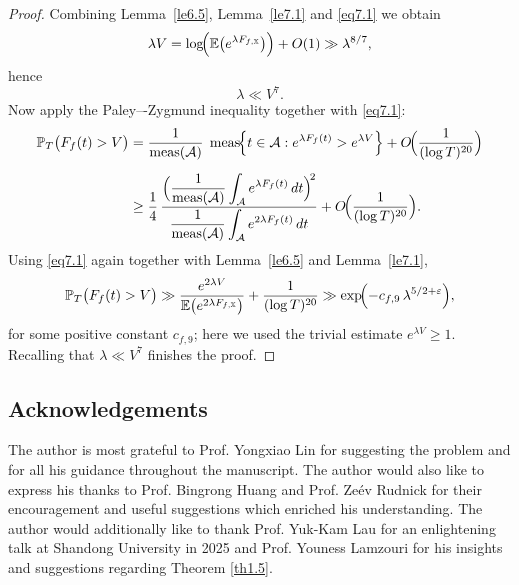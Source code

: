\documentclass[10pt,leqno]{amsart}
\numberwithin{equation}{section}
\begin{document}
\begin{proof}
    Combining Lemma~\ref{le6.5}, Lemma~\ref{le7.1} and \eqref{eq7.1} we obtain
    \[
    \lambda V = \log\!\Bigl(\mathbb{E}\bigl(e^{\lambda F_{f,\mathbb{X}}}\bigr)\Bigr)+O(1)
    \gg \lambda^{8/7},
    \]
    hence
    \[
    \lambda \ll  V^{7}.
    \]
    Now apply the Paley–-Zygmund inequality together with \eqref{eq7.1}:
    \[
    \begin{aligned}
    \mathbb{P}_T\bigl(F_f(t) > V\bigr)
    &=\frac{1}{\operatorname{meas}(\mathcal{A})}\;
    \operatorname{meas}\!\Bigl\{t\in\mathcal{A}:e^{\lambda F_f(t)}>e^{\lambda V}\Bigr\}
    +O\!\Bigl(\frac{1}{(\log T)^{20}}\Bigr) \\[2mm]
    &\geq\frac{1}{4}\,
    \frac{\displaystyle\Bigl(\frac{1}{\operatorname{meas}(\mathcal{A})}
          \int_{\mathcal{A}} e^{\lambda F_f(t)}\,dt\Bigr)^{\!2}}
        {\displaystyle\frac{1}{\operatorname{meas}(\mathcal{A})}
          \int_{\mathcal{A}} e^{2\lambda F_f(t)}\,dt}
          +O\!\Bigl(\frac{1}{(\log T)^{20}}\Bigr).
    \end{aligned}
    \]
    Using \eqref{eq7.1} again together with Lemma~\ref{le6.5} and Lemma~\ref{le7.1},
    \[
    \mathbb{P}_T\bigl(F_f(t) > V\bigr)
    \gg\frac{e^{2\lambda V}}{\mathbb{E}\bigl(e^{2\lambda F_{f,\mathbb{X}}}\bigr)}
    +\frac{1}{(\log T)^{20}}
    \gg\exp\!\Bigl(-c_{f,9}\,\lambda^{5/2+\varepsilon}\Bigr),
    \]
    for some positive constant $c_{f,9}$; here we used the trivial estimate $e^{\lambda V}\geq1$.  
    Recalling that $\lambda\ll V^{7}$ finishes the proof.
\end{proof}

\subsection*{Acknowledgements}
The author is most grateful to Prof. Yongxiao Lin for suggesting the problem and for all his guidance throughout the manuscript. The author would also like to express his thanks to Prof. Bingrong Huang and Prof. Ze\'ev Rudnick for their encouragement and useful suggestions which enriched his understanding. The author would additionally like to thank Prof. Yuk-Kam Lau for an enlightening talk at Shandong University in 2025 and Prof. Youness Lamzouri for his insights and suggestions regarding Theorem \ref{th1.5}.




\end{document}
